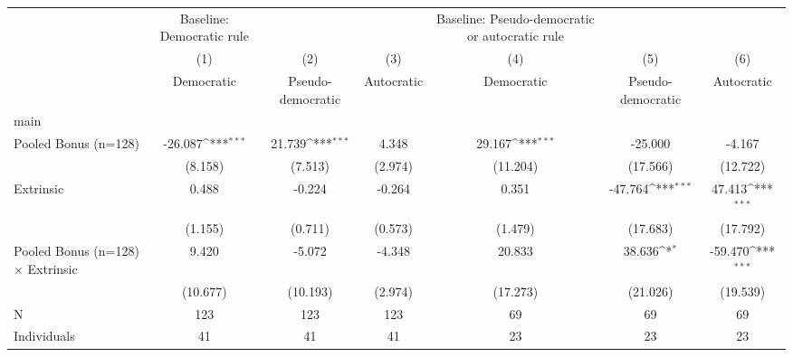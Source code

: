 {
\def\sym#1{\ifmmode^{#1}\else\(^{#1}\)\fi}
\begin{tabular}{l*{6}{c}}
\toprule
                    &Baseline: Democratic rule         &                     &                     &Baseline: Pseudo-democratic or autocratic rule         &                     &                     \\
                    &\multicolumn{1}{c}{(1)}&\multicolumn{1}{c}{(2)}&\multicolumn{1}{c}{(3)}&\multicolumn{1}{c}{(4)}&\multicolumn{1}{c}{(5)}&\multicolumn{1}{c}{(6)}\\
                    &\multicolumn{1}{c}{Democratic}&\multicolumn{1}{c}{Pseudo-democratic}&\multicolumn{1}{c}{Autocratic}&\multicolumn{1}{c}{Democratic}&\multicolumn{1}{c}{Pseudo-democratic}&\multicolumn{1}{c}{Autocratic}\\
\midrule
main                &                     &                     &                     &                     &                     &                     \\
Pooled Bonus (n=128)&     -26.087\sym{***}&      21.739\sym{***}&       4.348         &      29.167\sym{***}&     -25.000         &      -4.167         \\
                    &     (8.158)         &     (7.513)         &     (2.974)         &    (11.204)         &    (17.566)         &    (12.722)         \\
\addlinespace
Extrinsic           &       0.488         &      -0.224         &      -0.264         &       0.351         &     -47.764\sym{***}&      47.413\sym{***}\\
                    &     (1.155)         &     (0.711)         &     (0.573)         &     (1.479)         &    (17.683)         &    (17.792)         \\
\addlinespace
Pooled Bonus (n=128) $\times$ Extrinsic&       9.420         &      -5.072         &      -4.348         &      20.833         &      38.636\sym{*}  &     -59.470\sym{***}\\
                    &    (10.677)         &    (10.193)         &     (2.974)         &    (17.273)         &    (21.026)         &    (19.539)         \\
\midrule
N                   &         123         &         123         &         123         &          69         &          69         &          69         \\
Individuals         &          41         &          41         &          41         &          23         &          23         &          23         \\

\end{tabular}}
